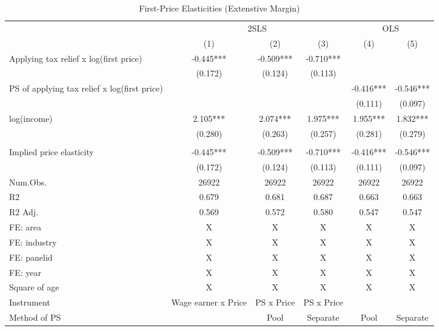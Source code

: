 \documentclass[
  11pt,
  a4paper,
]{article}
\begin{document}
\begin{table}

\caption{\label{tab:extensive}First-Price Elasticities (Extenstive Margin)}
\centering
\begin{tabular}[t]{lccccc}
\toprule
\multicolumn{1}{c}{ } & \multicolumn{3}{c}{2SLS} & \multicolumn{2}{c}{OLS} \\
\cmidrule(l{3pt}r{3pt}){2-4} \cmidrule(l{3pt}r{3pt}){5-6}
  & (1) & (2) & (3) & (4) & (5)\\
\midrule
Applying tax relief x log(first price) & -0.445*** & -0.509*** & -0.710*** &  & \\
 & (0.172) & (0.124) & (0.113) &  & \\
PS of applying tax relief x log(first price) &  &  &  & -0.416*** & -0.546***\\
 &  &  &  & (0.111) & (0.097)\\
log(income) & 2.105*** & 2.074*** & 1.975*** & 1.955*** & 1.832***\\
 & (0.280) & (0.263) & (0.257) & (0.281) & (0.279)\\
\midrule
 &  &  &  &  & \\
Implied price elasticity & -0.445*** & -0.509*** & -0.710*** & -0.416*** & -0.546***\\
 & (0.172) & (0.124) & (0.113) & (0.111) & (0.097)\\
Num.Obs. & 26922 & 26922 & 26922 & 26922 & 26922\\
R2 & 0.679 & 0.681 & 0.687 & 0.663 & 0.663\\
R2 Adj. & 0.569 & 0.572 & 0.580 & 0.547 & 0.547\\
FE: area & X & X & X & X & X\\
FE: industry & X & X & X & X & X\\
FE: panelid & X & X & X & X & X\\
FE: year & X & X & X & X & X\\
Square of age & X & X & X & X & X\\
Instrument & Wage earner x Price & PS x Price & PS x Price &  & \\
Method of PS &  & Pool & Separate & Pool & Separate\\
\bottomrule
\end{tabular}
\end{table}
\end{document}
